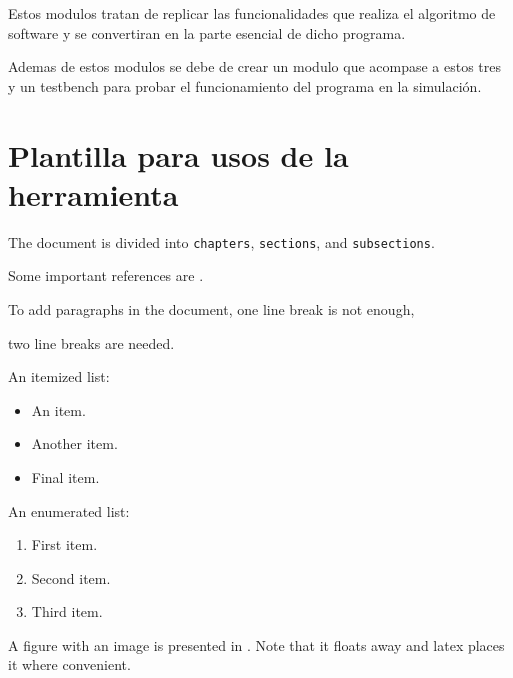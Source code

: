 	Estos modulos tratan de replicar las funcionalidades que realiza el algoritmo de software y se convertiran en la parte esencial
	de dicho programa. 
	
	Ademas de estos modulos se debe de crear un modulo que acompase a estos tres y un testbench para probar el funcionamiento
	del programa en la simulación.

\section{Plantilla para usos de la herramienta}
		The document is divided into \texttt{chapters}, \texttt{sections}, and \texttt{subsections}.

		Some important references are \cite{einstein,latexcompanion,knuthwebsite}.

		To add paragraphs in the document, 
		one line break is not enough,

		two line breaks are needed.

		An itemized list:

		\begin{itemize}
			\item An item.
			\item Another item.
			\item Final item.
		\end{itemize}

		An enumerated list:

		\begin{enumerate}
			\item First item.
			\item Second item.
			\item Third item.
		\end{enumerate}

		A figure with an image is presented in . Note that it floats away and latex places it where convenient.

